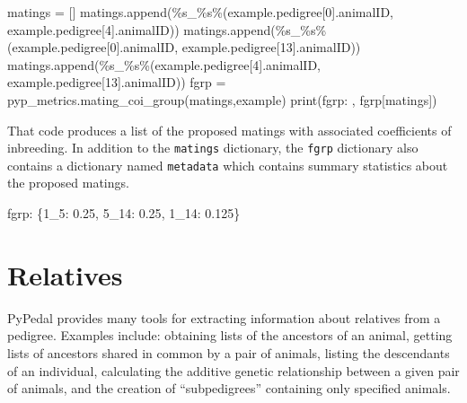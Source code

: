 \documentclass[
  letterpaper,
  DIV=11,
  numbers=noendperiod]{scrreprt}
\newenvironment{Shaded}{\begin{snugshade}}{\end{snugshade}}
\newcommand{\BuiltInTok}[1]{\textcolor[rgb]{0.00,0.23,0.31}{#1}}
\newcommand{\DecValTok}[1]{\textcolor[rgb]{0.68,0.00,0.00}{#1}}
\newcommand{\FloatTok}[1]{\textcolor[rgb]{0.68,0.00,0.00}{#1}}
\newcommand{\NormalTok}[1]{\textcolor[rgb]{0.00,0.23,0.31}{#1}}
\newcommand{\OperatorTok}[1]{\textcolor[rgb]{0.37,0.37,0.37}{#1}}
\newcommand{\SpecialCharTok}[1]{\textcolor[rgb]{0.37,0.37,0.37}{#1}}
\newcommand{\StringTok}[1]{\textcolor[rgb]{0.13,0.47,0.30}{#1}}
\begin{document}
\begin{Shaded}
\begin{Highlighting}[]
\NormalTok{matings }\OperatorTok{=}\NormalTok{ []}
\NormalTok{matings.append(}\StringTok{\textquotesingle{}}\SpecialCharTok{\%s}\StringTok{\_}\SpecialCharTok{\%s}\StringTok{\textquotesingle{}}\OperatorTok{\%}\NormalTok{(example.pedigree[}\DecValTok{0}\NormalTok{].animalID, example.pedigree[}\DecValTok{4}\NormalTok{].animalID))}
\NormalTok{matings.append(}\StringTok{\textquotesingle{}}\SpecialCharTok{\%s}\StringTok{\_}\SpecialCharTok{\%s}\StringTok{\textquotesingle{}}\OperatorTok{\%}\NormalTok{(example.pedigree[}\DecValTok{0}\NormalTok{].animalID, example.pedigree[}\DecValTok{13}\NormalTok{].animalID))}
\NormalTok{matings.append(}\StringTok{\textquotesingle{}}\SpecialCharTok{\%s}\StringTok{\_}\SpecialCharTok{\%s}\StringTok{\textquotesingle{}}\OperatorTok{\%}\NormalTok{(example.pedigree[}\DecValTok{4}\NormalTok{].animalID, example.pedigree[}\DecValTok{13}\NormalTok{].animalID))}
\NormalTok{fgrp }\OperatorTok{=}\NormalTok{ pyp\_metrics.mating\_coi\_group(matings,example)}
\BuiltInTok{print}\NormalTok{(}\StringTok{\textquotesingle{}fgrp: \textquotesingle{}}\NormalTok{, fgrp[}\StringTok{\textquotesingle{}matings\textquotesingle{}}\NormalTok{])}
\end{Highlighting}
\end{Shaded}

That code produces a list of the proposed matings with associated
coefficients of inbreeding. In addition to the \texttt{matings}
dictionary, the \texttt{fgrp} dictionary also contains a dictionary
named \texttt{metadata} which contains summary statistics about the
proposed matings.

\begin{Shaded}
\begin{Highlighting}[]
\NormalTok{fgrp:  \{}\StringTok{\textquotesingle{}1\_5\textquotesingle{}}\NormalTok{: }\FloatTok{0.25}\NormalTok{, }\StringTok{\textquotesingle{}5\_14\textquotesingle{}}\NormalTok{: }\FloatTok{0.25}\NormalTok{, }\StringTok{\textquotesingle{}1\_14\textquotesingle{}}\NormalTok{: }\FloatTok{0.125}\NormalTok{\}}
\end{Highlighting}
\end{Shaded}

\section{Relatives}\label{sec-computing-relatives}

PyPedal provides many tools for extracting information about relatives
from a pedigree. Examples include: obtaining lists of the ancestors of
an animal, getting lists of ancestors shared in common by a pair of
animals, listing the descendants of an individual, calculating the
additive genetic relationship between a given pair of animals, and the
creation of ``subpedigrees'' containing only specified animals.
\end{document}
